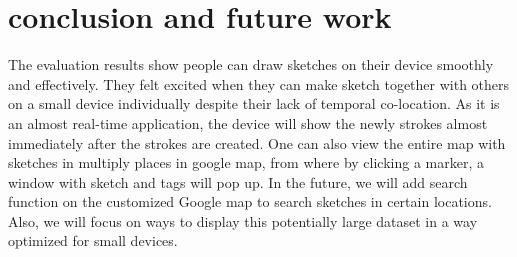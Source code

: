 \documentclass{chi2009}
\begin{document}
\section{conclusion and future work}
The evaluation results show people can draw sketches on their device smoothly and effectively. They felt excited when they can make sketch together with others on a small device individually despite their lack of temporal co-location. As it is an almost real-time application, the device will show the newly strokes almost immediately after the strokes are created. One can also view the entire map with sketches in multiply places in google map, from where by clicking a marker, a window with sketch and tags will pop up. In the future, we will add search function on the customized Google map to search sketches in certain locations. Also, we will focus on ways to display this potentially large dataset in a way optimized for small devices.




\end{document}
